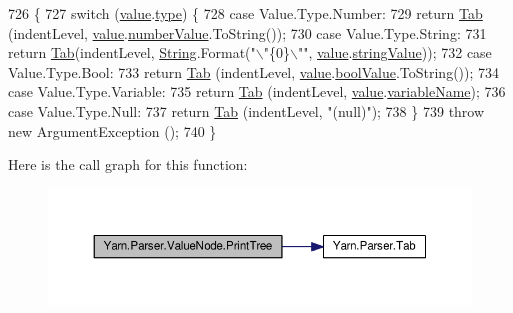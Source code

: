 \begin{DoxyCode}
726             \{
727                 \textcolor{keywordflow}{switch} (\hyperlink{a00182_a51ab5939344f9bfa21181c02cf0e341d}{value}.\hyperlink{a00181_a6d5820fafa766911b9da84d1ed33e51a}{type}) \{
728                 \textcolor{keywordflow}{case} Value.Type.Number:
729                     \textcolor{keywordflow}{return} \hyperlink{a00143_aa8fa36b46de12a1c561d77b99c4b9ae3}{Tab} (indentLevel, \hyperlink{a00182_a51ab5939344f9bfa21181c02cf0e341d}{value}.\hyperlink{a00181_ae1892c1c7a8177537d1caa39a2e51da6}{numberValue}.ToString());
730                 \textcolor{keywordflow}{case} Value.Type.String:
731                     \textcolor{keywordflow}{return} \hyperlink{a00143_aa8fa36b46de12a1c561d77b99c4b9ae3}{Tab}(indentLevel, \hyperlink{a00045_a301aa7c866593a5b625a8fc158bbeacea27118326006d3829667a400ad23d5d98}{String}.Format(\textcolor{stringliteral}{"\(\backslash\)"\{0\}\(\backslash\)""}, 
      \hyperlink{a00182_a51ab5939344f9bfa21181c02cf0e341d}{value}.\hyperlink{a00181_add1b07146f1a9e4b655b33c93d07dff9}{stringValue}));
732                 \textcolor{keywordflow}{case} Value.Type.Bool:
733                     \textcolor{keywordflow}{return} \hyperlink{a00143_aa8fa36b46de12a1c561d77b99c4b9ae3}{Tab} (indentLevel, \hyperlink{a00182_a51ab5939344f9bfa21181c02cf0e341d}{value}.\hyperlink{a00181_acb140e3466e132528409d4c441fd67da}{boolValue}.ToString());
734                 \textcolor{keywordflow}{case} Value.Type.Variable:
735                     \textcolor{keywordflow}{return} \hyperlink{a00143_aa8fa36b46de12a1c561d77b99c4b9ae3}{Tab} (indentLevel, \hyperlink{a00182_a51ab5939344f9bfa21181c02cf0e341d}{value}.\hyperlink{a00181_a8ee2b09b7d28eaf97bf63c74d0023bfd}{variableName});
736                 \textcolor{keywordflow}{case} Value.Type.Null:
737                     \textcolor{keywordflow}{return} \hyperlink{a00143_aa8fa36b46de12a1c561d77b99c4b9ae3}{Tab} (indentLevel, \textcolor{stringliteral}{"(null)"});
738                 \}
739                 \textcolor{keywordflow}{throw} \textcolor{keyword}{new} ArgumentException ();
740             \}
\end{DoxyCode}


Here is the call graph for this function\-:
\nopagebreak
\begin{figure}[H]
\begin{center}
\leavevmode
\includegraphics[width=350pt]{a00182_ae4659e4431e9846a45e0d048c960781a_cgraph}
\end{center}
\end{figure}


